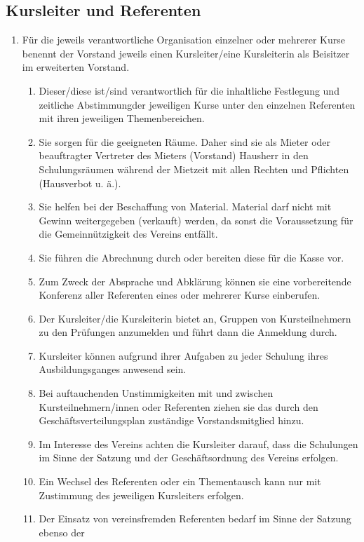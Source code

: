 \documentclass[10pt, twocolumn, parskip=half]{scrartcl}
\begin{document}
\subsection{Kursleiter und Referenten}
\begin{enumerate}[noitemsep]
	\item Für die jeweils verantwortliche Organisation einzelner oder mehrerer Kurse benennt der Vorstand jeweils einen Kursleiter/eine Kursleiterin als Beisitzer im erweiterten Vorstand.
		\begin{enumerate}[noitemsep]
			\item Dieser/diese ist/sind verantwortlich für die inhaltliche Festlegung und zeitliche Abstimmungder jeweiligen Kurse unter den einzelnen Referenten mit ihren jeweiligen Themenbereichen.
			\item Sie sorgen für die geeigneten Räume. Daher sind sie als Mieter oder
			beauftragter Vertreter des Mieters (Vorstand) Hausherr in den Schulungsräumen während der
			Mietzeit mit allen Rechten und Pflichten (Hausverbot u. ä.).
			\item Sie helfen bei der Beschaffung von Material. Material darf nicht mit Gewinn weitergegeben
			(verkauft) werden, da sonst die Voraussetzung für die Gemeinnützigkeit des Vereins entfällt.
			\item Sie führen die Abrechnung durch oder bereiten diese für die Kasse vor.
			\item Zum Zweck der Absprache und Abklärung können sie eine vorbereitende Konferenz aller
			Referenten eines oder mehrerer Kurse einberufen.
			\item Der Kursleiter/die Kursleiterin bietet an, Gruppen von Kursteilnehmern zu den Prüfungen
			anzumelden und führt dann die Anmeldung durch.
			\item Kursleiter können aufgrund ihrer Aufgaben zu jeder Schulung ihres Ausbildungsganges
			anwesend sein.
			\item Bei auftauchenden Unstimmigkeiten mit und zwischen Kursteilnehmern/innen oder
			Referenten ziehen sie das durch den Geschäftsverteilungsplan zuständige Vorstandsmitglied
			hinzu.
			\item Im Interesse des Vereins achten die Kursleiter darauf, dass die Schulungen im Sinne der
			Satzung und der Geschäftsordnung des Vereins erfolgen.
			\item Ein Wechsel des Referenten oder ein Thementausch kann nur mit Zustimmung des jeweiligen
			Kursleiters erfolgen.
			\item Der Einsatz von vereinsfremden Referenten bedarf im Sinne der Satzung ebenso der

\end{enumerate}
\end{enumerate}
\end{document}
